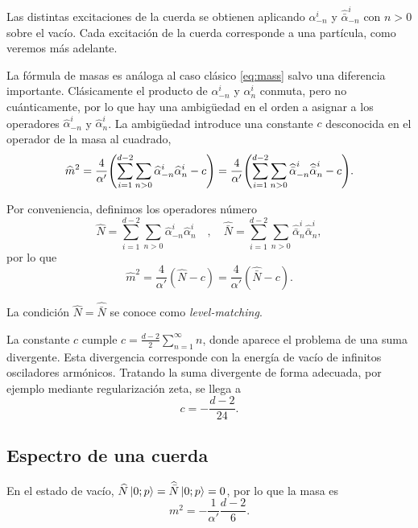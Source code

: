Las distintas excitaciones de la cuerda se obtienen aplicando $\alpha_{-n}^i$ y $\widehat{\bar\alpha}_{-n}^i$
con $n>0$ sobre el vacío.
Cada excitación de la cuerda corresponde a una partícula, como veremos más adelante.

La fórmula de masas es análoga al caso clásico \ref{eq:mass} salvo una diferencia importante.
Clásicamente el producto de $\alpha^i_{-n}$ y $\alpha^i_n$ conmuta, pero no cuánticamente, por lo que hay una 
ambigüedad en el orden a asignar a los operadores $\widehat\alpha^i_{-n}$ y $\widehat \alpha^i_n$.
La ambigüedad introduce una constante $c$ desconocida en el operador de la masa al cuadrado,
\begin{equation}
  \widehat m^2 = \frac{4}{\alpha'}\qty(\sum_{i=1}^{d-2} \sum_{n>0} \widehat \alpha_{-n}^i \widehat\alpha_n^i -c)
  = \frac{4}{\alpha'}\qty(\sum_{i=1}^{d-2} \sum_{n>0} \widehat{\bar \alpha}_{-n}^i\widehat{\bar \alpha}_n^i -c).
\end{equation}

Por conveniencia, definimos los operadores número
\begin{equation}
  \widehat N=\sum_{i=1}^{d-2} \sum_{n>0}\widehat \alpha_{-n}^i\widehat\alpha_n^i \quad , \quad   
  \widehat {\bar N}=\sum_{i=1}^{d-2} \sum_{n>0} \widehat{\bar \alpha}_n^i\widehat{ \bar\alpha}_n^i, 
\end{equation}
por lo que 
\begin{equation}
  \widehat m^2 = \frac{4}{\alpha'} (\widehat N -c ) = \frac{4}{\alpha'} (\widehat{\bar N} -c).
  \label{eq:massdef}
\end{equation}

La condición $\widehat N=\widehat {\bar N}$ se conoce como \emph{level-matching}.

La constante $c$ cumple $c=\frac{d-2}{2} \sum_{n=1}^\infty n$, donde aparece el problema de
una suma divergente.
Esta divergencia corresponde con la energía de vacío de infinitos osciladores armónicos.
Tratando la suma divergente de forma adecuada, por ejemplo mediante regularización zeta, se llega a
\begin{equation}
  c=-\frac{d-2}{24}.
\end{equation}

\subsection{Espectro de una cuerda}
En el estado de vacío, $\widehat N\ket{0;p}=\widehat {\bar N}\ket{0;p}=0$, por lo que la masa es
\begin{equation}
  m^2 = -\frac{1}{\alpha'}\frac{d-2}{6}.
\end{equation}


